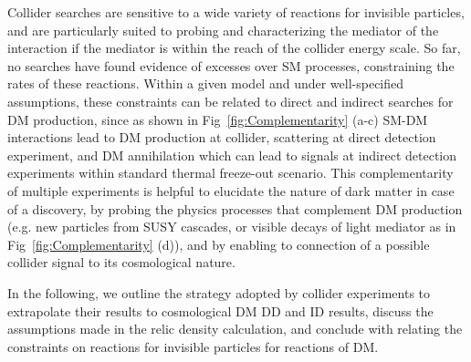 Collider searches are sensitive to a wide variety of reactions for invisible particles, and are particularly suited to probing and characterizing the mediator of the interaction if the mediator is within the reach of the collider energy scale. %
So far, no searches have found evidence of excesses over SM processes, constraining the rates of these reactions.
Within a given model and under well-specified assumptions, these constraints can be related to direct and indirect searches for DM production, since as shown in Fig~\ref{fig:Complementarity} (a-c) SM-DM interactions lead to DM production at collider, scattering at direct detection experiment, and DM annihilation which can lead to signals at indirect detection experiments within standard thermal freeze-out scenario. 
This complementarity of multiple experiments is helpful to elucidate the nature of dark matter in case of a discovery,
by probing the physics processes that complement DM production (e.g. new particles from SUSY cascades, or visible decays of light mediator as in Fig~\ref{fig:Complementarity} (d)), 
and by enabling to connection of a possible collider signal to its cosmological nature. %



In the following, we outline the strategy adopted by collider experiments to extrapolate their results to cosmological DM DD and ID results, discuss the assumptions made in the relic density calculation, and conclude with relating the constraints on reactions for invisible particles for reactions of DM.

